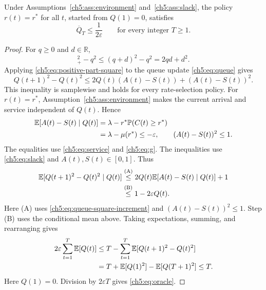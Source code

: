 \begin{Thm:Lemma}
Under Assumptions~\ref{ch5:ass:environment} and~\ref{ch5:ass:slack},
the policy $r(t)=r^*$ for all $t$, started from $Q(1)=0$, satisfies
\begin{equation}
 \overline Q_T\le\frac{1}{2\varepsilon}
 \qquad\text{for every integer }T\ge1.
 \label{ch5:eq:oracle}
\end{equation}
\end{Thm:Lemma}

\begin{proof}
For $q\ge0$ and $d\in\mathbb R$,
\begin{equation}
 [q+d]_+^2-q^2\le(q+d)^2-q^2=2qd+d^2.
 \label{ch5:eq:positive-part-square}
\end{equation}
Applying \eqref{ch5:eq:positive-part-square}
to the queue update \eqref{ch5:eq:queue} gives
\begin{equation}
 Q(t+1)^2-Q(t)^2\le2Q(t)(A(t)-S(t))+(A(t)-S(t))^2.
 \label{ch5:eq:queue-square-increment}
\end{equation}
This inequality is samplewise and holds for every rate-selection policy.
For $r(t)=r^*$, Assumption~\ref{ch5:ass:environment} makes the current
arrival and service independent of $Q(t)$. Hence
\[
\begin{aligned}
 \mathbb{E}[A(t)-S(t)\mid Q(t)]
 &=\lambda-r^*\mathbb P(C(t)\ge r^*)\\
 &=\lambda-\mu(r^*)\le-\varepsilon,
 \qquad (A(t)-S(t))^2\le1.
\end{aligned}
\]
The equalities use \eqref{ch5:eq:service} and \eqref{ch5:eq:g}. The
inequalities use \eqref{ch5:eq:slack} and $A(t),S(t)\in[0,1]$.
Thus
\begin{align}
\mathbb{E}[Q(t+1)^2-Q(t)^2\mid Q(t)]
 &\overset{\text{(A)}}{\le}2Q(t)\mathbb{E}[A(t)-S(t)\mid Q(t)]+1\notag\\
 &\overset{\text{(B)}}{\le}1-2\varepsilon Q(t).
\label{ch5:eq:oracle-drift}
\end{align}
Here (A) uses \eqref{ch5:eq:queue-square-increment} and $(A(t)-S(t))^2\le1$.
Step (B) uses the conditional mean above.
Taking expectations, summing, and rearranging gives
\begin{align*}
2\varepsilon\sum_{t=1}^T\mathbb{E}[Q(t)]
 &\le T-\sum_{t=1}^T\mathbb{E}[Q(t+1)^2-Q(t)^2]\\
 &=T+\mathbb{E}[Q(1)^2]-\mathbb{E}[Q(T+1)^2]\le T.
\end{align*}
Here $Q(1)=0$. Division by $2\varepsilon T$ gives
\eqref{ch5:eq:oracle}.
\end{proof}

